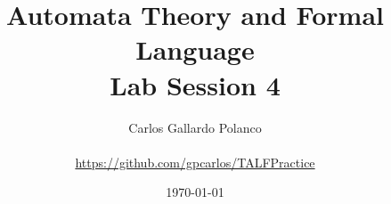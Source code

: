 \newcommand{\subject}{Automata Theory and Formal Language}
\newcommand{\practice}{Lab Session 4}

\title{\subject \\ \practice}
\author{{\large Carlos Gallardo Polanco } \\ {\small  }
             \\ {\small \url{https://github.com/gpcarlos/TALFPractice}}}
\date{\today}
